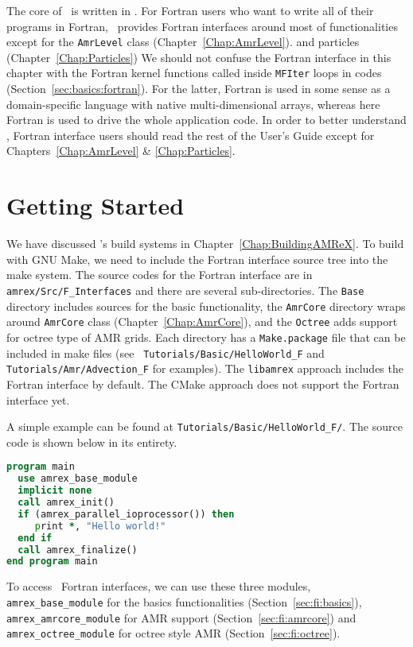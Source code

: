 The core of \amrex\ is written in \cpp.  For Fortran users who want to
write all of their programs in Fortran, \amrex\ provides Fortran
interfaces around most of functionalities except for 
the {\tt AmrLevel} class (Chapter~\ref{Chap:AmrLevel}).  
and particles (Chapter~\ref{Chap:Particles}) 
We should not confuse the Fortran
interface in this chapter with the Fortran kernel functions called
inside {\tt MFIter} loops in \cpp codes
(Section~\ref{sec:basics:fortran}).  For the latter, Fortran is used
in some sense as a domain-specific language with native
multi-dimensional arrays, whereas here Fortran is used to drive the
whole application code.  In order to better understand \amrex, Fortran
interface users should read the rest of the User's Guide except for
Chapters~\ref{Chap:AmrLevel} \& \ref{Chap:Particles}. 

\section{Getting Started}

We have discussed \amrex's build systems in
Chapter~\ref{Chap:BuildingAMReX}.  To build with GNU Make, we need to
include the Fortran interface source tree into the make system.  The
source codes for the Fortran interface are in {\tt
amrex/Src/F\_Interfaces} and there are several sub-directories.  The
{\tt Base} directory includes sources for the basic functionality, the
{\tt AmrCore} directory wraps around {\tt AmrCore} class
(Chapter~\ref{Chap:AmrCore}), and the {\tt Octree} adds support for
octree type of AMR grids.  Each directory has a {\tt Make.package}
file that can be included in make files (see {\tt
Tutorials/Basic/HelloWorld\_F} and {\tt Tutorials/Amr/Advection\_F}
for examples).  The {\tt libamrex} approach includes the Fortran
interface by default.  The CMake approach does not support the Fortran
interface yet.

A simple example can be found at {\tt Tutorials/Basic/HelloWorld\_F/}.
The source code is shown below in its entirety.  
\begin{lstlisting}[language=fortran]
program main
  use amrex_base_module
  implicit none
  call amrex_init()
  if (amrex_parallel_ioprocessor()) then
     print *, "Hello world!"
  end if
  call amrex_finalize()
end program main
\end{lstlisting}

To access \amrex\ Fortran interfaces, we can use these three
modules, {\tt amrex\_base\_module} for the basics functionalities
(Section~\ref{sec:fi:basics}), {\tt amrex\_amrcore\_module} for AMR
support (Section~\ref{sec:fi:amrcore}) and {\tt amrex\_octree\_module}
for octree style AMR (Section~\ref{sec:fi:octree}).

